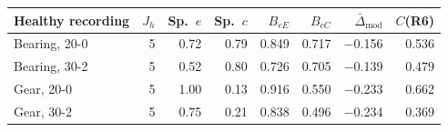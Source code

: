 \begin{tabular}{@{}l r rrrr rr@{}}
\toprule
Healthy recording & $J_h$ & Sp.\ $e$ & Sp.\ $c$ & $B_{eE}$ & $B_{cC}$ & $\bar\Delta_{\mathrm{mod}}$ & $C$(R6) \\
\midrule
Bearing, 20-0 & 5 & 0.72 & 0.79 & 0.849 & 0.717 & $-$0.156 & 0.536 \\
Bearing, 30-2 & 5 & 0.52 & 0.80 & 0.726 & 0.705 & $-$0.139 & 0.479 \\
Gear, 20-0 & 5 & 1.00 & 0.13 & 0.916 & 0.550 & $-$0.233 & 0.662 \\
Gear, 30-2 & 5 & 0.75 & 0.21 & 0.838 & 0.496 & $-$0.234 & 0.369 \\
\bottomrule
\end{tabular}
